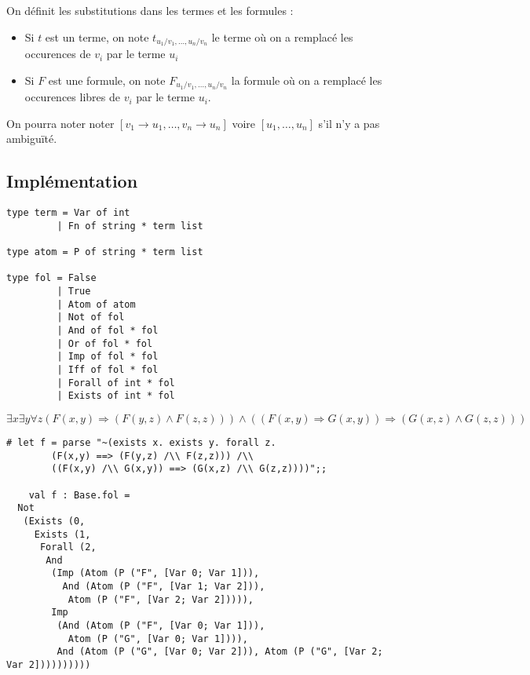 \documentclass[9pt]{beamer}
\begin{document}
\begin{frame}
\begin{definition}
  On définit les substitutions dans les termes et les formules :
  \begin{itemize}
  \item Si $t$ est un terme, on note $t_{u_1/v_1,\dots,u_n/v_n}$ le terme où on a remplacé les occurences de $v_i$ par le terme $u_i$
  \item Si $F$ est une formule, on note $F_{u_1/v_1,\dots,u_n/v_n}$ la formule où on a remplacé les occurences libres de $v_i$ par le terme $u_i$.
  \end{itemize}

  On pourra noter noter $[v_1\rightarrow u_1,\dots,v_n\rightarrow u_n]$ voire $[u_1,\dots,u_n]$ s'il n'y a pas ambiguïté.
\end{definition}
\end{frame}

\subsection{Implémentation}

\begin{frame}[fragile]
  \begin{lstlisting}
type term = Var of int
         | Fn of string * term list

type atom = P of string * term list

type fol = False
         | True
         | Atom of atom
         | Not of fol
         | And of fol * fol
         | Or of fol * fol
         | Imp of fol * fol
         | Iff of fol * fol
         | Forall of int * fol
         | Exists of int * fol

  \end{lstlisting}
\end{frame}

\begin{frame}[fragile]
\[\exists x \exists y \forall z
  (F(x,y) \Rightarrow (F(y,z) \wedge F(z,z))) \wedge
  ((F(x,y) \Rightarrow G(x,y)) \Rightarrow (G(x,z) \wedge G(z,z)))\]

\begin{lstlisting}
# let f = parse "~(exists x. exists y. forall z.
        (F(x,y) ==> (F(y,z) /\\ F(z,z))) /\\
        ((F(x,y) /\\ G(x,y)) ==> (G(x,z) /\\ G(z,z))))";;

    val f : Base.fol =
  Not
   (Exists (0,
     Exists (1,
      Forall (2,
       And
        (Imp (Atom (P ("F", [Var 0; Var 1])),
          And (Atom (P ("F", [Var 1; Var 2])),
           Atom (P ("F", [Var 2; Var 2])))),
        Imp
         (And (Atom (P ("F", [Var 0; Var 1])),
           Atom (P ("G", [Var 0; Var 1]))),
         And (Atom (P ("G", [Var 0; Var 2])), Atom (P ("G", [Var 2; Var 2])))))))))
\end{lstlisting}
\end{frame}
\end{document}
